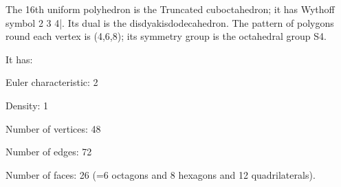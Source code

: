 The 16th uniform polyhedron is the Truncated cuboctahedron; it has Wythoff symbol 2 3 4|. Its dual is the disdyakisdodecahedron. The pattern of polygons round each vertex is (4,6,8); its symmetry group is the octahedral group S4.\par
It has:\par
Euler characteristic: 2\par
Density: 1\par
Number of vertices: 48\par
Number of edges:  72\par
Number of faces: 26 (=6 octagons and 8 hexagons and 12 quadrilaterals).